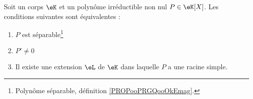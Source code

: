 \begin{proposition}         \label{PROPooMOZFooDGemBJ}
    Soit un corps \( \eK\) et un polynôme irréductible non nul \( P\in \eK[X]\). Les conditions suivantes sont équivalentes :
    \begin{enumerate}
        \item       \label{ITEMooDOTTooTZGhSq}
            \( P\) est séparable\footnote{Polynôme séparable, définition \ref{PROPooPRGQooOkEmag}.}
        \item       \label{ITEMooRTDCooJGEtum}
            \( P'\neq 0\)
        \item       \label{ITEMooZOMZooDPrNaC}
            Il existe une extension \( \eL\) de \( \eK\) dans laquelle \( P\) a une racine simple.
    \end{enumerate}
\end{proposition}

